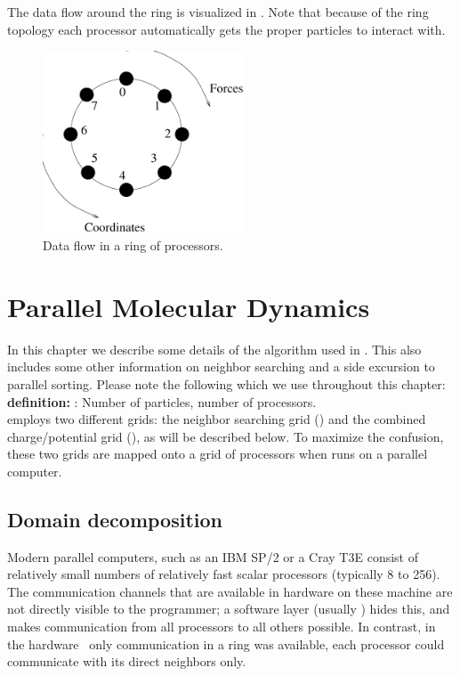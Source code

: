 The data flow around the ring is visualized in . 
Note that because of the ring topology each processor automatically 
gets the proper particles to interact with.
\begin {figure}
\centerline{\includegraphics[width=6cm]{plots/ring}}
\caption {Data flow in a ring of processors.}
\label{fig:ring}
\end {figure}

\section{Parallel Molecular Dynamics}
In this chapter we describe some details of the   
algorithm used 
in {\gromacs}. This also includes some other information on neighbor searching and
a side excursion to parallel sorting.
Please note the following which we use throughout this chapter:\\
{\bf definition:} {\natom}: Number of particles, {\nproc} number of processors.\\
{\gromacs} employs two different grids: the neighbor searching grid ({\nsgrid})
and the combined charge/po\-ten\-tial grid ({\fftgrid}), as will be described below.
To maximize the confusion, 
these two grids are mapped onto a grid of processors when {\gromacs} runs on a 
parallel computer.

\subsection{Domain decomposition}
Modern parallel computers, such as an IBM SP/2 or a Cray T3E
consist of relatively small numbers of relatively fast scalar
processors (typically 8 to 256).  The communication channels that are
available in hardware on these machine are not directly visible to
the programmer; a software layer (usually ) 
hides this, and makes communication from all processors to all
others possible. In contrast, in the {\gromacs} hardware~\cite{Berendsen95a}
only communication in a ring was available, {\ie} each processor could communicate
with its direct neighbors only.

